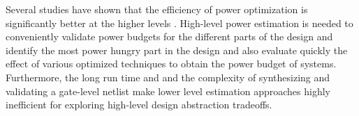 
Several studies have shown that the efficiency of power optimization is significantly better at the higher levels \cite{Landman1996,Gupta2000,Raghunathan2003,Reimer2006}.
High-level power estimation is needed to conveniently validate power budgets for the different parts of the design and identify the most power hungry part in the design and also evaluate quickly the effect of various optimized techniques to obtain the power budget of systems. 
Furthermore, the long run time and and the complexity of synthesizing and validating a gate-level netlist make lower level estimation approaches highly inefficient for exploring high-level design abstraction tradeoffs.

